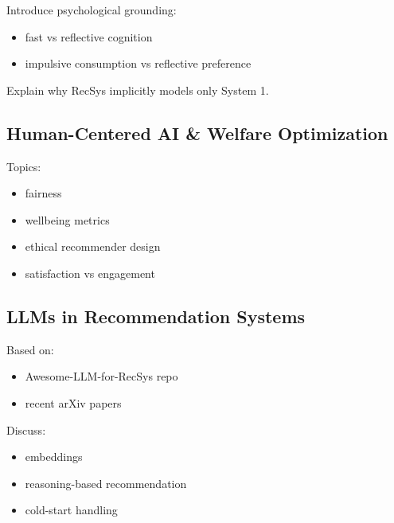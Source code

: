 Introduce psychological grounding:

\begin{itemize}
    \item fast vs reflective cognition
    \item impulsive consumption vs reflective preference
\end{itemize}

Explain why RecSys implicitly models only System 1.

\subsection{Human-Centered AI \& Welfare Optimization}

Topics:

\begin{itemize}
    \item fairness
    \item wellbeing metrics
    \item ethical recommender design
    \item satisfaction vs engagement
\end{itemize}

\subsection{LLMs in Recommendation Systems}

Based on:

\begin{itemize}
    \item Awesome-LLM-for-RecSys repo
    \item recent arXiv papers
\end{itemize}

Discuss:

\begin{itemize}
    \item embeddings
    \item reasoning-based recommendation
    \item cold-start handling
\end{itemize}



